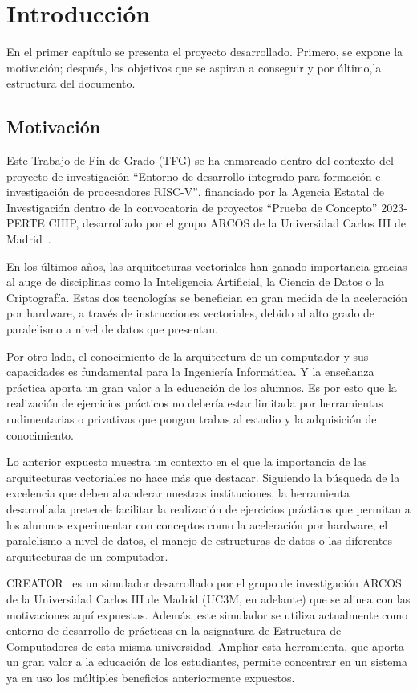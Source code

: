 \chapter{Introducción}\label{chap:introduction}
En el primer capítulo se presenta el proyecto desarrollado. Primero, se expone la motivación; después, los objetivos que se aspiran a conseguir y por último,la estructura del documento.

\section{Motivación}\label{sec:motivation}

Este Trabajo de Fin de Grado (TFG) se ha enmarcado dentro del contexto del proyecto de investigación ``Entorno de desarrollo integrado para formación e investigación de procesadores RISC-V'', financiado por la Agencia Estatal de Investigación dentro de la convocatoria de proyectos ``Prueba de Concepto'' 2023-PERTE CHIP, desarrollado por el grupo ARCOS de la Universidad Carlos III de Madrid~\cite{arcos-investigacion}.

En los últimos años, las arquitecturas vectoriales han ganado importancia gracias al auge de disciplinas como la Inteligencia Artificial, la Ciencia de Datos o la Criptografía. Estas dos tecnologías se benefician en gran medida de la aceleración por hardware, a través de instrucciones vectoriales, debido al alto grado de paralelismo a nivel de datos que presentan.

Por otro lado, el conocimiento de la arquitectura de un computador y sus capacidades es fundamental para la Ingeniería Informática. Y la enseñanza práctica aporta un gran valor a la educación de los alumnos. Es por esto que la realización de ejercicios prácticos no debería estar limitada por herramientas rudimentarias o privativas que pongan trabas al estudio y la adquisición de conocimiento. 

Lo anterior expuesto muestra un contexto en el que la importancia de las arquitecturas vectoriales no hace más que destacar. Siguiendo la búsqueda de la excelencia que deben abanderar nuestras instituciones, la herramienta desarrollada pretende facilitar la realización de ejercicios prácticos que permitan a los alumnos experimentar con conceptos como la aceleración por hardware, el paralelismo a nivel de datos, el manejo de estructuras de datos o las diferentes arquitecturas de un computador.

CREATOR~\cite{camarmas2024creator} es un simulador desarrollado por el grupo de investigación ARCOS de la Universidad Carlos III de Madrid (UC3M, en adelante) que se alinea con las motivaciones aquí expuestas. Además, este simulador se utiliza actualmente como entorno de desarrollo de prácticas en la asignatura de Estructura de Computadores de esta misma universidad. Ampliar esta herramienta, que aporta un gran valor a la educación de los estudiantes, permite concentrar en un sistema ya en uso los múltiples beneficios anteriormente expuestos.

